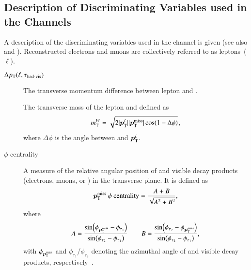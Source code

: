 \subsection{Description of Discriminating Variables used in the \lephad
  Channels}%
\label{app:lephad_mva_variables}

A description of the discriminating variables used in the \lephad channel is
given (see also  and
). Reconstructed electrons and muons are collectively
referred to as leptons~($\ell$).
\begin{description}

\item[$\Delta p_{\text{T}}(\ell, \tau_{\text{had-vis}})$] The transverse momentum difference between
  lepton and \tauhadvis.

\item[\mTW] The transverse mass of the lepton and \pTmiss defined as
  \begin{align*}
    m_{\text{T}}^W = \sqrt{2 |\bm{p}_{\text{T}}^{\ell}| |\bm{p}_{\text{T}}^{\text{miss}}| \cos(1 -
    \Delta\phi)} \,\text{,}
  \end{align*}
  where $\Delta\phi$ is the angle between \pTmiss and
  $\bm{p}_{\text{T}}^{\ell}$.

\item[\pTmissAbs $\phi$ centrality] A measure of the relative angular position of
  \pTmiss and visible \taulepton decay products (electrons, muons, or
  \tauhadvis) in the transverse plane. It is defined as
  \begin{align*}
    \bm{p}_{\text{T}}^{\text{miss}}\text{ }\phi\text{ centrality} = \frac{A + B}{\sqrt{A^2 + B^2}} \text{,}
  \end{align*}
  where
  \begin{align*}
    A = \frac{\sin(\phi_{\bm{p}_{\text{T}}^{\text{miss}}} - \phi_{\tau_1})}{\sin(\phi_{\tau_2} - \phi_{\tau_1})} \qquad B = \frac{\sin(\phi_{\tau_2} - \phi_{\bm{p}_{\text{T}}^{\text{miss}}})}{\sin(\phi_{\tau_2} - \phi_{\tau_1})} \text{,}
  \end{align*}
  with $\phi_{\bm{p}_{\text{T}}^{\text{miss}}}$ and $\phi_{\tau_1}$/$\phi_{\tau_2}$ denoting the
  azimuthal angle of \pTmiss and visible \taulepton decay products,
  respectively~\cite{HIGG-2013-32, HIGG-2016-16-witherratum}.


\end{description}
